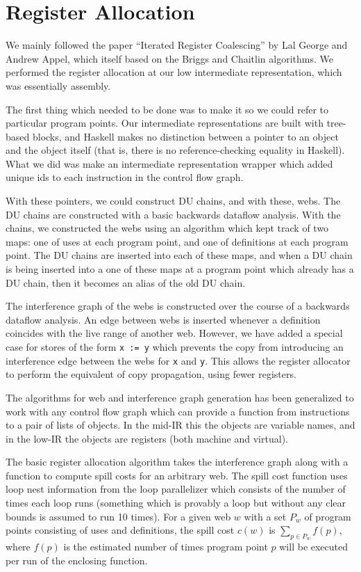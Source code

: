 \documentclass[11pt]{article}
\begin{document}
\section {Register Allocation}
\label{sec:regalloc}

We mainly followed the paper ``Iterated Register Coalescing'' by Lal
George and Andrew Appel, which itself based on the Briggs and Chaitlin
algorithms.  We performed the register allocation at our low
intermediate representation, which was essentially assembly.

The first thing which needed to be done was to make it so we could
refer to particular program points.  Our intermediate representations
are built with tree-based blocks, and Haskell makes no distinction
between a pointer to an object and the object itself (that is, there
is no reference-checking equality in Haskell).  What we did was make
an intermediate representation wrapper which added unique ids to each
instruction in the control flow graph.

With these pointers, we could construct DU chains, and with these,
webs.  The DU chains are constructed with a basic backwards dataflow
analysis.  With the chains, we constructed the webs using an algorithm
which kept track of two maps: one of uses at each program point, and
one of definitions at each program point.  The DU chains are inserted
into each of these maps, and when a DU chain is being inserted into a
one of these maps at a program point which already has a DU chain,
then it becomes an alias of the old DU chain.

The interference graph of the webs is constructed over the course of a
backwards dataflow analysis.  An edge between webs is inserted
whenever a definition coincides with the live range of another web.
However, we have added a special case for stores of the form \texttt{x
  := y} which prevents the copy from introducing an interference edge
between the webs for \texttt{x} and \texttt{y}.  This allows the
register allocator to perform the equivalent of copy propagation,
using fewer registers.

The algorithms for web and interference graph generation has been
generalized to work with any control flow graph which can provide a
function from instructions to a pair of lists of objects.  In the
mid-IR this the objects are variable names, and in the low-IR the
objects are registers (both machine and virtual).

The basic register allocation algorithm takes the interference graph
along with a function to compute spill costs for an arbitrary web.
The spill cost function uses loop nest information from the loop
parallelizer which consists of the number of times each loop runs
(something which is provably a loop but without any clear bounds is
assumed to run 10 times).  For a given web $w$ with a set $P_w$ of
program points consisting of uses and definitions, the spill cost
$c(w)$ is $\sum_{p\in P_w} f(p)$, where $f(p)$ is the estimated number
of times program point $p$ will be executed per run of the enclosing
function.
\end{document}
